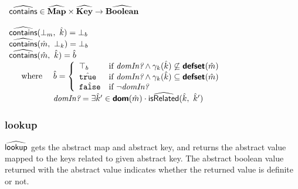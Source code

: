 $\begin{array}{l}
\widehat{\textsf{contains}} \in \widehat{\textbf{Map}} \times \widehat{\textbf{Key}} \rightarrow \widehat{\textbf{Boolean}} \\\\
\widehat{\textsf{contains}}(\bot_m,\ \hat{k}) = \bot_b \\
\widehat{\textsf{contains}}(\hat{m},\ \bot_k) = \bot_b \\
\widehat{\textsf{contains}}(\hat{m},\ \hat{k}) = \hat{b} \\
\quad \begin{array}{ll} \textrm{where }
& \hat{b} = \left \{ \begin{array}{ll}
\top_b & \textrm{if } \emph{domIn?} \land \gamma_k(\hat{k}) \not\subseteq \textsf{\textbf{defset}}(\hat{m}) \\
\hat{\texttt{true}} & \textrm{if } \emph{domIn?} \land \gamma_k(\hat{k}) \subseteq \textsf{\textbf{defset}}(\hat{m}) \\
\hat{\texttt{false}} & \textrm{if } \neg \emph{domIn?} \\
\end{array} \right.\\
& \emph{domIn?} = \exists \hat{k}' \in \textsf{\textbf{dom}}(\hat{m}) \cdot
\widehat{\textsf{isRelated}}(\hat{k},\ \hat{k}')\\
\end{array}\\
\end{array}$

\subsubsection{lookup}
$\widehat{\textsf{lookup}}$ gets the abstract map and abstract key,
and returns the abstract value mapped to the keys related to given abstract key.
The abstract boolean value returned with the abstract value indicates
whether the returned value is definite or not.\\

